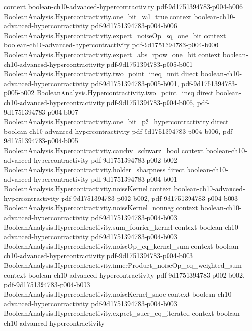 \begin{theorem}
  {context}
  {boolean-ch10-advanced-hypercontractivity}
  {pdf-9d1751394783-p004-b006}
\proofstep
  {BooleanAnalysis.Hypercontractivity.one_bit_val_true}
  {context}
  {boolean-ch10-advanced-hypercontractivity}
  {pdf-9d1751394783-p004-b006}
\proofstep
  {BooleanAnalysis.Hypercontractivity.expect_noiseOp_sq_one_bit}
  {context}
  {boolean-ch10-advanced-hypercontractivity}
  {pdf-9d1751394783-p004-b006}
\proofstep
  {BooleanAnalysis.Hypercontractivity.expect_abs_rpow_one_bit}
  {context}
  {boolean-ch10-advanced-hypercontractivity}
  {pdf-9d1751394783-p005-b001}
\proofstep
  {BooleanAnalysis.Hypercontractivity.two_point_ineq_unit}
  {direct}
  {boolean-ch10-advanced-hypercontractivity}
  {pdf-9d1751394783-p005-b001,
    pdf-9d1751394783-p005-b002}
\proofstep
  {BooleanAnalysis.Hypercontractivity.two_point_ineq}
  {direct}
  {boolean-ch10-advanced-hypercontractivity}
  {pdf-9d1751394783-p004-b006,
    pdf-9d1751394783-p004-b007}
\proofstep
  {BooleanAnalysis.Hypercontractivity.one_bit_p2_hypercontractivity}
  {direct}
  {boolean-ch10-advanced-hypercontractivity}
  {pdf-9d1751394783-p004-b006,
    pdf-9d1751394783-p004-b005}
\proofstep
  {BooleanAnalysis.Hypercontractivity.cauchy_schwarz_bool}
  {context}
  {boolean-ch10-advanced-hypercontractivity}
  {pdf-9d1751394783-p002-b002}
\proofstep
  {BooleanAnalysis.Hypercontractivity.holder_sharpness}
  {direct}
  {boolean-ch10-advanced-hypercontractivity}
  {pdf-9d1751394783-p004-b001}
\proofstep
  {BooleanAnalysis.Hypercontractivity.noiseKernel}
  {context}
  {boolean-ch10-advanced-hypercontractivity}
  {pdf-9d1751394783-p002-b002,
    pdf-9d1751394783-p004-b003}
\proofstep
  {BooleanAnalysis.Hypercontractivity.noiseKernel_nonneg}
  {context}
  {boolean-ch10-advanced-hypercontractivity}
  {pdf-9d1751394783-p004-b003}
\proofstep
  {BooleanAnalysis.Hypercontractivity.sum_fourier_kernel}
  {context}
  {boolean-ch10-advanced-hypercontractivity}
  {pdf-9d1751394783-p004-b003}
\proofstep
  {BooleanAnalysis.Hypercontractivity.noiseOp_eq_kernel_sum}
  {context}
  {boolean-ch10-advanced-hypercontractivity}
  {pdf-9d1751394783-p004-b003}
\proofstep
  {BooleanAnalysis.Hypercontractivity.innerProduct_noiseOp_eq_weighted_sum}
  {context}
  {boolean-ch10-advanced-hypercontractivity}
  {pdf-9d1751394783-p002-b002,
    pdf-9d1751394783-p004-b003}
\proofstep
  {BooleanAnalysis.Hypercontractivity.noiseKernel_snoc}
  {context}
  {boolean-ch10-advanced-hypercontractivity}
  {pdf-9d1751394783-p004-b003}
\proofstep
  {BooleanAnalysis.Hypercontractivity.expect_succ_eq_iterated}
  {context}
  {boolean-ch10-advanced-hypercontractivity}

\end{theorem}
